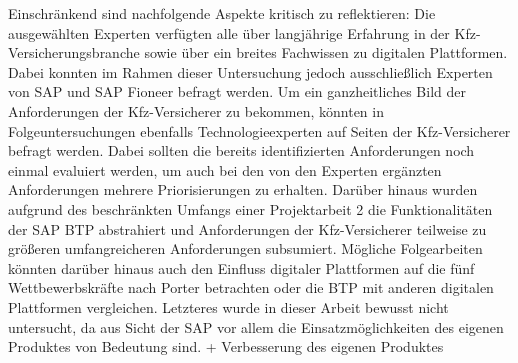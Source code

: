 
Einschränkend sind nachfolgende Aspekte kritisch zu reflektieren: Die ausgewählten Experten verfügten alle über langjährige Erfahrung in der Kfz-Versicherungsbranche sowie über ein breites Fachwissen zu digitalen Plattformen. Dabei konnten im Rahmen dieser Untersuchung jedoch ausschließlich Experten von SAP und SAP Fioneer befragt werden. Um ein ganzheitliches Bild der Anforderungen der Kfz-Versicherer zu bekommen, könnten in Folgeuntersuchungen ebenfalls Technologieexperten auf Seiten der Kfz-Versicherer befragt werden. Dabei sollten die bereits identifizierten Anforderungen noch einmal evaluiert werden, um auch bei den von den Experten ergänzten Anforderungen mehrere Priorisierungen zu erhalten. Darüber hinaus wurden aufgrund des beschränkten Umfangs einer Projektarbeit 2 die Funktionalitäten der SAP BTP abstrahiert und Anforderungen der Kfz-Versicherer teilweise zu größeren umfangreicheren Anforderungen subsumiert. Mögliche Folgearbeiten könnten darüber hinaus auch den Einfluss digitaler Plattformen auf die fünf Wettbewerbskräfte nach Porter betrachten oder die BTP mit anderen digitalen Plattformen vergleichen. Letzteres wurde in dieser Arbeit bewusst nicht untersucht, da aus Sicht der SAP vor allem die Einsatzmöglichkeiten des eigenen Produktes von Bedeutung sind. + Verbesserung des eigenen Produktes

